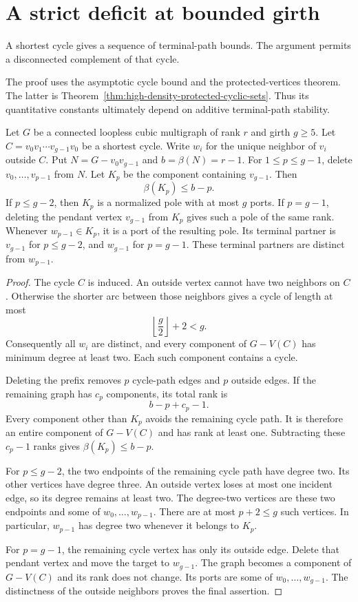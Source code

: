 \section{A strict deficit at bounded girth}
\label{sec:path-fixed-girth}

A shortest cycle gives a sequence of terminal-path bounds.
The argument permits a disconnected complement of that cycle.

The proof uses the asymptotic cycle bound and the protected-vertices theorem.
The latter is Theorem~\ref{thm:high-density-protected-cyclic-sets}.
Thus its quantitative constants ultimately depend on additive terminal-path stability.

\begin{lemma}
\label{lem:path-shortest-cycle-prefix}
Let $G$ be a connected loopless cubic multigraph of rank $r$ and girth $g\ge5$.
Let $C=v_0v_1\cdots v_{g-1}v_0$ be a shortest cycle.
Write $w_i$ for the unique neighbor of $v_i$ outside $C$.
Put $N=G-v_0v_{g-1}$ and $b=\beta(N)=r-1$.
For $1\le p\le g-1$, delete $v_0,\ldots,v_{p-1}$ from $N$.
Let $K_p$ be the component containing $v_{g-1}$.
Then
\[
 \beta(K_p)\le b-p.
\]
If $p\le g-2$, then $K_p$ is a normalized pole with at most $g$ ports.
If $p=g-1$, deleting the pendant vertex $v_{g-1}$ from $K_p$ gives such a pole of the same rank.
Whenever $w_{p-1}\in K_p$, it is a port of the resulting pole.
Its terminal partner is $v_{g-1}$ for $p\le g-2$, and $w_{g-1}$ for $p=g-1$.
These terminal partners are distinct from $w_{p-1}$.
\end{lemma}

\begin{proof}
The cycle $C$ is induced.
An outside vertex cannot have two neighbors on $C$.
Otherwise the shorter arc between those neighbors gives a cycle of length at most
\[
 \left\lfloor\frac g2\right\rfloor+2<g.
\]
Consequently all $w_i$ are distinct, and every component of $G-V(C)$ has minimum degree at least two.
Each such component contains a cycle.

Deleting the prefix removes $p$ cycle-path edges and $p$ outside edges.
If the remaining graph has $c_p$ components, its total rank is
\[
 b-p+c_p-1.
\]
Every component other than $K_p$ avoids the remaining cycle path.
It is therefore an entire component of $G-V(C)$ and has rank at least one.
Subtracting these $c_p-1$ ranks gives $\beta(K_p)\le b-p$.

For $p\le g-2$, the two endpoints of the remaining cycle path have degree two.
Its other vertices have degree three.
An outside vertex loses at most one incident edge, so its degree remains at least two.
The degree-two vertices are these two endpoints and some of $w_0,\ldots,w_{p-1}$.
There are at most $p+2\le g$ such vertices.
In particular, $w_{p-1}$ has degree two whenever it belongs to $K_p$.

For $p=g-1$, the remaining cycle vertex has only its outside edge.
Delete that pendant vertex and move the target to $w_{g-1}$.
The graph becomes a component of $G-V(C)$ and its rank does not change.
Its ports are some of $w_0,\ldots,w_{g-1}$.
The distinctness of the outside neighbors proves the final assertion.
\end{proof}

